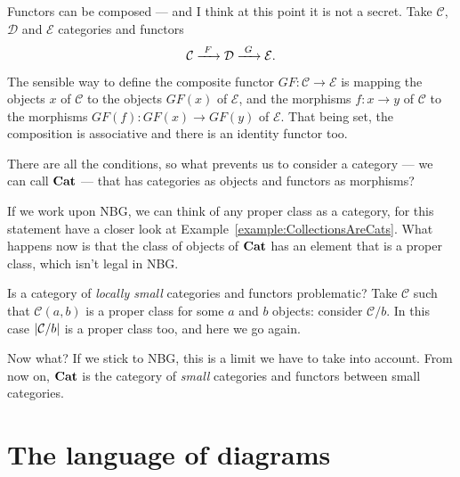 Functors can be composed --- and I think at this point it is not a
secret. Take \(\mathcal{C}\), \(\mathcal{D}\) and \(\mathcal{E}\) categories and
functors
\[\mathcal{C} \xrightarrow{\ F\ } \mathcal{D} \xrightarrow{\ G\ } \mathcal{E} .\]
The sensible way to define the composite functor
\(GF : \mathcal{C} \to \mathcal{E}\) is mapping the objects \(x\) of \(\mathcal{C}\) to
the objects \(GF(x)\) of \(\mathcal{E}\), and the morphisms \(f : x \to y\) of
\(\mathcal{C}\) to the morphisms \(GF(f) : GF(x) \to GF(y)\) of \(\mathcal{E}\). That being set, the composition is associative and there is an
identity functor too.

There are all the conditions, so what prevents us to consider a category
--- we can call \(\bf Cat\) --- that has categories as objects and functors
as morphisms?

If we work upon NBG, we can think of any proper class as a category, for
this statement have a closer look at
Example~\ref{example:CollectionsAreCats}. What happens now is that the
class of objects of \(\bf Cat\) has an element that is a proper class,
which isn't legal in NBG.

Is a category of {\em locally small} categories and functors
problematic? Take \(\mathcal{C}\) such that \(\mathcal{C}(a, b)\) is a proper
class for some \(a\) and \(b\) objects: consider \(\mathcal{C}{/}{b}\). In
this case \(\left\lvert\mathcal{C}/b\right\rvert\) is a proper class too, and here we go
again.

Now what? If we stick to NBG, this is a limit we have to take into
account. From now on, \(\bf Cat\) is the category of {\em small}
categories and functors between small categories.



\section{The language of diagrams}

